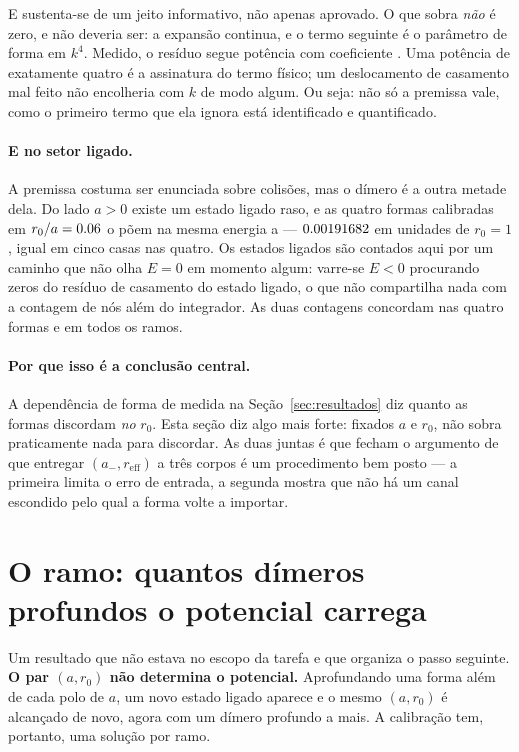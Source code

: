 \documentclass[11pt,a4paper]{article}
\begin{document}
E sustenta-se de um jeito informativo, não apenas aprovado. O que sobra
\emph{não} é zero, e não deveria ser: a expansão continua, e o termo seguinte é
o parâmetro de forma em $k^4$. Medido, o resíduo segue potência
\textbf{\EtrychPremissaPotencia{}} com coeficiente \EtrychPremissaCoef{}. Uma
potência de exatamente quatro é a assinatura do termo físico; um deslocamento
de casamento mal feito não encolheria com $k$ de modo algum. Ou seja: não só a
premissa vale, como o primeiro termo que ela ignora está identificado e
quantificado.

\paragraph{E no setor ligado.} A premissa costuma ser enunciada sobre colisões,
mas o dímero é a outra metade dela. Do lado $a>0$ existe um estado ligado raso,
e as quatro formas calibradas em $r_0/a=0.06{}$ o põem na mesma
energia a \EtrychDimeroLeque{} --- $0.00191682{}$ em unidades de
$r_0=1$, igual em cinco casas nas quatro. Os estados ligados são contados aqui
por um caminho que não olha $E=0$ em momento algum: varre-se $E<0$ procurando
zeros do resíduo de casamento do estado ligado, o que não compartilha nada com
a contagem de nós além do integrador. As duas contagens concordam nas quatro
formas e em todos os ramos.

\paragraph{Por que isso é a conclusão central.} A dependência de forma de
\EtrychLequeAmenos{} medida na Seção~\ref{sec:resultados} diz quanto as formas
discordam \emph{no} $r_0$. Esta seção diz algo mais forte: fixados $a$ e $r_0$,
não sobra praticamente nada para discordar. As duas juntas é que fecham o
argumento de que entregar $(a_-,r_\mathrm{eff})$ a três corpos é um procedimento
bem posto --- a primeira limita o erro de entrada, a segunda mostra que não há
um canal escondido pelo qual a forma volte a importar.

\section{O ramo: quantos dímeros profundos o potencial carrega}
\label{sec:ramos}

Um resultado que não estava no escopo da tarefa e que organiza o passo
seguinte. \textbf{O par $(a,r_0)$ não determina o potencial.} Aprofundando uma
forma além de cada polo de $a$, um novo estado ligado aparece e o mesmo
$(a,r_0)$ é alcançado de novo, agora com um dímero profundo a mais. A
calibração tem, portanto, uma solução por ramo.
\end{document}
